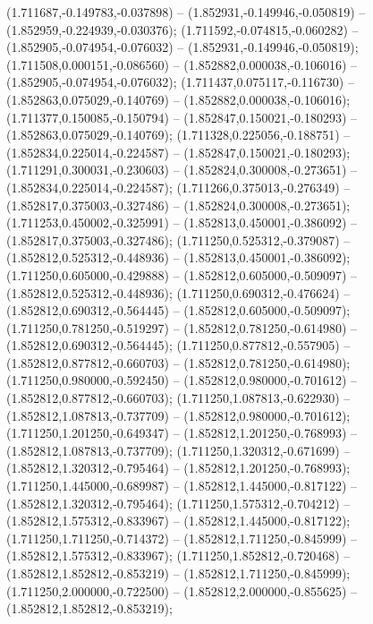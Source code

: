  (1.711687,-0.149783,-0.037898) -- (1.852931,-0.149946,-0.050819) -- (1.852959,-0.224939,-0.030376);
 (1.711592,-0.074815,-0.060282) -- (1.852905,-0.074954,-0.076032) -- (1.852931,-0.149946,-0.050819);
 (1.711508,0.000151,-0.086560) -- (1.852882,0.000038,-0.106016) -- (1.852905,-0.074954,-0.076032);
 (1.711437,0.075117,-0.116730) -- (1.852863,0.075029,-0.140769) -- (1.852882,0.000038,-0.106016);
 (1.711377,0.150085,-0.150794) -- (1.852847,0.150021,-0.180293) -- (1.852863,0.075029,-0.140769);
 (1.711328,0.225056,-0.188751) -- (1.852834,0.225014,-0.224587) -- (1.852847,0.150021,-0.180293);
 (1.711291,0.300031,-0.230603) -- (1.852824,0.300008,-0.273651) -- (1.852834,0.225014,-0.224587);
 (1.711266,0.375013,-0.276349) -- (1.852817,0.375003,-0.327486) -- (1.852824,0.300008,-0.273651);
 (1.711253,0.450002,-0.325991) -- (1.852813,0.450001,-0.386092) -- (1.852817,0.375003,-0.327486);
 (1.711250,0.525312,-0.379087) -- (1.852812,0.525312,-0.448936) -- (1.852813,0.450001,-0.386092);
 (1.711250,0.605000,-0.429888) -- (1.852812,0.605000,-0.509097) -- (1.852812,0.525312,-0.448936);
 (1.711250,0.690312,-0.476624) -- (1.852812,0.690312,-0.564445) -- (1.852812,0.605000,-0.509097);
 (1.711250,0.781250,-0.519297) -- (1.852812,0.781250,-0.614980) -- (1.852812,0.690312,-0.564445);
 (1.711250,0.877812,-0.557905) -- (1.852812,0.877812,-0.660703) -- (1.852812,0.781250,-0.614980);
 (1.711250,0.980000,-0.592450) -- (1.852812,0.980000,-0.701612) -- (1.852812,0.877812,-0.660703);
 (1.711250,1.087813,-0.622930) -- (1.852812,1.087813,-0.737709) -- (1.852812,0.980000,-0.701612);
 (1.711250,1.201250,-0.649347) -- (1.852812,1.201250,-0.768993) -- (1.852812,1.087813,-0.737709);
 (1.711250,1.320312,-0.671699) -- (1.852812,1.320312,-0.795464) -- (1.852812,1.201250,-0.768993);
 (1.711250,1.445000,-0.689987) -- (1.852812,1.445000,-0.817122) -- (1.852812,1.320312,-0.795464);
 (1.711250,1.575312,-0.704212) -- (1.852812,1.575312,-0.833967) -- (1.852812,1.445000,-0.817122);
 (1.711250,1.711250,-0.714372) -- (1.852812,1.711250,-0.845999) -- (1.852812,1.575312,-0.833967);
 (1.711250,1.852812,-0.720468) -- (1.852812,1.852812,-0.853219) -- (1.852812,1.711250,-0.845999);
 (1.711250,2.000000,-0.722500) -- (1.852812,2.000000,-0.855625) -- (1.852812,1.852812,-0.853219);
